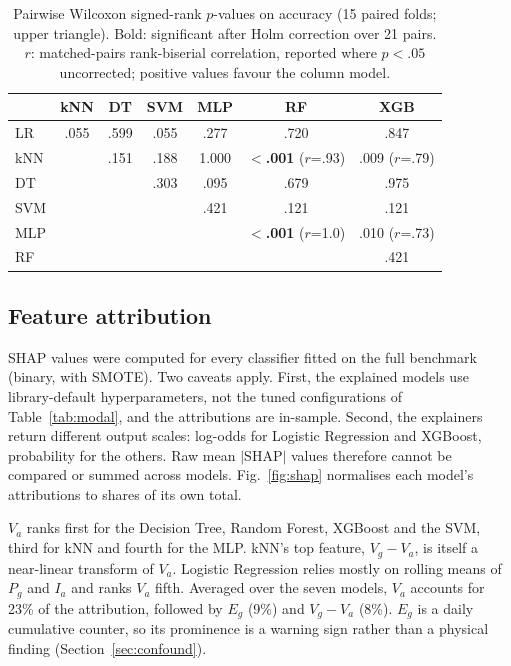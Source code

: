 \documentclass[11pt,a4paper]{article}
\begin{document}
\begin{table}[t]
\centering
\caption{Pairwise Wilcoxon signed-rank $p$-values on accuracy (15 paired folds; upper triangle). Bold: significant after Holm correction over 21 pairs. $r$: matched-pairs rank-biserial correlation, reported where $p<.05$ uncorrected; positive values favour the column model.}
\label{tab:wilcoxon}
\small
\begin{tabular}{@{}lcccccc@{}}
\toprule
 & kNN & DT & SVM & MLP & RF & XGB \\
\midrule
LR & .055 & .599 & .055 & .277 & .720 & .847 \\
kNN & & .151 & .188 & 1.000 & \textbf{$<$.001} ($r$=.93) & .009 ($r$=.79) \\
DT & & & .303 & .095 & .679 & .975 \\
SVM & & & & .421 & .121 & .121 \\
MLP & & & & & \textbf{$<$.001} ($r$=1.0) & .010 ($r$=.73) \\
RF & & & & & & .421 \\
\bottomrule
\end{tabular}
\end{table}

\subsection{Feature attribution}
\label{sec:shap}

SHAP values were computed for every classifier fitted on the full benchmark (binary, with SMOTE). Two caveats apply. First, the explained models use library-default hyperparameters, not the tuned configurations of Table~\ref{tab:modal}, and the attributions are in-sample. Second, the explainers return different output scales: log-odds for Logistic Regression and XGBoost, probability for the others. Raw mean $|$SHAP$|$ values therefore cannot be compared or summed across models. Fig.~\ref{fig:shap} normalises each model's attributions to shares of its own total.

$V_a$ ranks first for the Decision Tree, Random Forest, XGBoost and the SVM, third for kNN and fourth for the MLP. kNN's top feature, $V_g-V_a$, is itself a near-linear transform of $V_a$. Logistic Regression relies mostly on rolling means of $P_g$ and $I_a$ and ranks $V_a$ fifth. Averaged over the seven models, $V_a$ accounts for 23\% of the attribution, followed by $E_g$ (9\%) and $V_g-V_a$ (8\%). $E_g$ is a daily cumulative counter, so its prominence is a warning sign rather than a physical finding (Section~\ref{sec:confound}).
\end{document}
